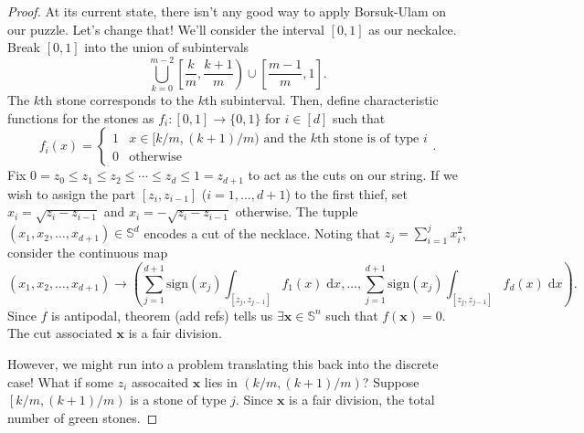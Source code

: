 \documentclass[12pt]{amsart}
\theoremstyle{definition}
\begin{document}
    \begin{proof}
        At its current state, there isn't any good way to apply Borsuk-Ulam on our puzzle. Let's change that! We'll consider the interval $[0,1]$ as our neckalce. Break $[0,1]$ into the union of subintervals $$\bigcup_{k=0}^{m-2} \left[\frac km, \frac{k+1}{m}\right) \cup \left[\frac{m-1}{m}, 1\right].$$ The $k$th stone corresponds to the $k$th subinterval. Then, define characteristic functions for the stones as $f_i:[0,1] \to \{0,1\}$ for $i \in [d]$ such that $$f_i(x) = \begin{cases} 1 & x \in [k/m, (k+1)/m) \text{ and the $k$th stone is of type $i$}\\ 0 & \text{otherwise} \end{cases}.$$ Fix $0 = z_0 \leq z_1 \leq z_2 \leq \cdots \leq z_d \leq 1 = z_{d+1}$ to act as the cuts on our string. If we wish to assign the part $[z_i,z_{i-1}]$ ($i = 1, \ldots, d+1$) to the first thief, set $x_i = \sqrt{z_{i} - z_{i-1}}$ and $x_i = -\sqrt{z_i - z_{i-1}}$ otherwise. The tupple $(x_1,x_2,\ldots,x_{d+1}) \in \mathbb S^d$ encodes a cut of the necklace. Noting that $z_j = \sum_{i=1}^{j} x_i^2$, consider the continuous map $$(x_1,x_2,\ldots,x_{d+1}) \to \left(\sum_{j=1}^{d+1} \mathrm{sign}(x_j) \int_{[z_j,z_{j-1}]} f_1(x) \; \mathrm{d}x , \ldots, \sum_{j=1}^{d+1} \mathrm{sign}(x_j) \int_{[z_j,z_{j-1}]} f_d(x) \; \mathrm{d}x\right).$$ Since $f$ is antipodal, theorem (add refs) tells us $\exists \mathbf x \in \mathbb S^n$ such that $f(\mathbf x) = 0$. The cut associated $\mathbf x$ is a fair division. 

        However, we might run into a problem translating this back into the discrete case! What if some $z_i$ assocaited $\mathbf x$ lies in $\left(k/m, (k+1)/m\right)$? Suppose $\left[k/m, (k+1)/m\right)$ is a stone of type $j$. Since $\mathbf x$ is a fair division, the total number of green stones.
    \end{proof}

    


    \newpage


    
\end{document}
